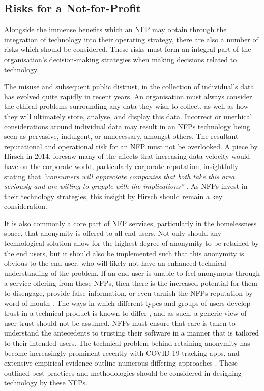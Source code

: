 \subsection{Risks for a Not-for-Profit}

Alongside the immense benefits which an NFP may obtain through the integration of technology into their operating strategy, there are also a number of risks which should be considered. These risks must form an integral part of the organisation's decision-making strategies when making decisions related to technology.

The misuse and subsequent public distrust, in the collection of individual's data has evolved quite rapidly in recent years. An organisation must always consider the ethical problems surrounding any data they wish to collect, as well as how they will ultimately store, analyse, and display this data. Incorrect or unethical considerations around individual data may result in an NFPs technology being seen as pervasive, indulgent, or unnecessary, amongst others. The resultant reputational and operational risk for an NFP must not be overlooked. A piece by Hirsch in 2014, foresaw many of the affects that increasing data velocity would have on the corporate world, particularly corporate reputation, insightfully stating that \emph{“consumers will appreciate companies that both take this area seriously and are willing to grapple with the implications”} \cite[p.~39]{hirsch2013corporate}. As NFPs invest in their technology strategies, this insight by Hirsch should remain a key consideration.

It is also commonly a core part of NFP services, particularly in the homelessness space, that anonymity is offered to all end users. Not only should any technological solution allow for the highest degree of anonymity to be retained by the end users, but it should also be implemented such that this anonymity is obvious to the end user, who will likely not have an enhanced technical understanding of the problem. If an end user is unable to feel anonymous through a service offering from these NFPs, then there is the increased potential for them to disengage, provide false information, or even tarnish the NFPs reputation by word-of-mouth \cite{gefen2003managing}. The ways in which different types and groups of users develop trust in a technical product is known to differ \cite{xu2014different}, and as such, a generic view of user trust should not be assumed. NFPs must ensure that care is taken to understand the antecedents to trusting their software in a manner that is tailored to their intended users. The technical problem behind retaining anonymity has become increasingly prominent recently with COVID-19 tracking apps, and extensive empirical evidence outline numerous differing approaches \cite{rowe2020contact} \cite{tang2020privacy} \cite{cho2020contact}. These outlined best practices and methodologies should be considered in designing technology by these NFPs.

